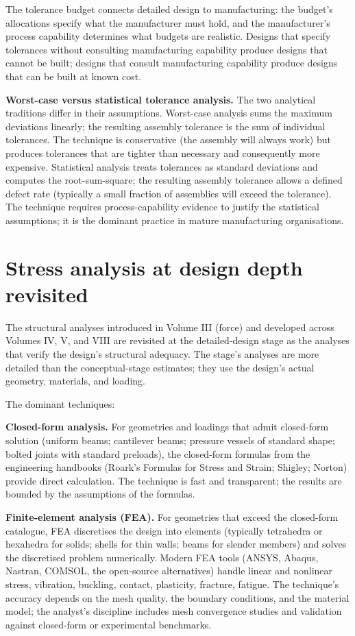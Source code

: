 The tolerance budget connects detailed design to manufacturing: the budget's allocations specify what the manufacturer must hold, and the manufacturer's process capability determines what budgets are realistic. Designs that specify tolerances without consulting manufacturing capability produce designs that cannot be built; designs that consult manufacturing capability produce designs that can be built at known cost.

\textbf{Worst-case versus statistical tolerance analysis.} The two analytical traditions differ in their assumptions. Worst-case analysis sums the maximum deviations linearly; the resulting assembly tolerance is the sum of individual tolerances. The technique is conservative (the assembly will always work) but produces tolerances that are tighter than necessary and consequently more expensive. Statistical analysis treats tolerances as standard deviations and computes the root-sum-square; the resulting assembly tolerance allows a defined defect rate (typically a small fraction of assemblies will exceed the tolerance). The technique requires process-capability evidence to justify the statistical assumptions; it is the dominant practice in mature manufacturing organisations.

\section{Stress analysis at design depth revisited}

The structural analyses introduced in Volume III (force) and developed across Volumes IV, V, and VIII are revisited at the detailed-design stage as the analyses that verify the design's structural adequacy. The stage's analyses are more detailed than the conceptual-stage estimates; they use the design's actual geometry, materials, and loading.

The dominant techniques:

\textbf{Closed-form analysis.} For geometries and loadings that admit closed-form solution (uniform beams; cantilever beams; pressure vessels of standard shape; bolted joints with standard preloads), the closed-form formulas from the engineering handbooks (Roark's Formulas for Stress and Strain; Shigley; Norton) provide direct calculation. The technique is fast and transparent; the results are bounded by the assumptions of the formulas.

\textbf{Finite-element analysis (FEA).} For geometries that exceed the closed-form catalogue, FEA discretises the design into elements (typically tetrahedra or hexahedra for solids; shells for thin walls; beams for slender members) and solves the discretised problem numerically. Modern FEA tools (ANSYS, Abaqus, Nastran, COMSOL, the open-source alternatives) handle linear and nonlinear stress, vibration, buckling, contact, plasticity, fracture, fatigue. The technique's accuracy depends on the mesh quality, the boundary conditions, and the material model; the analyst's discipline includes mesh convergence studies and validation against closed-form or experimental benchmarks.


